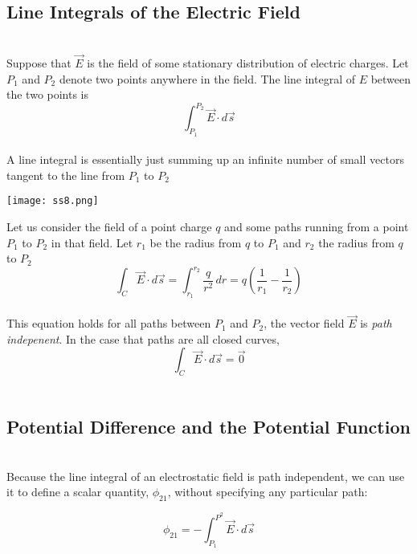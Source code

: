 \documentclass[svgnames]{article}
\begin{document}
\subsection{Line Integrals of the Electric Field} \mbox{} \\

Suppose that $\vec{E}$ is the field of some stationary distribution of electric charges. Let $P_1$ and $P_2$ denote two points anywhere in the field. The line integral of $E$ between the two points is 
\[ \int_{P_1}^{P_2} \vec{E} \cdot d\vec{s} \] \\

A line integral is essentially just summing up an infinite number of small vectors tangent to the line from $P_1$ to $P_2$ \\ 

\begin{center}
\texttt{[image: ss8.png]}
\end{center} 

Let us consider the field of a point charge $q$ and some paths running from a point $P_1$ to $P_2$ in that field. Let $r_1$ be the radius from $q$ to $P_1$ and $r_2$ the radius from $q$ to $P_2$ \\ 

\[ \int_C \vec{E} \cdot d\vec{s} = \int_{r_1}^{r_2} \frac{q}{r^2} \, dr = q\left(\frac{1}{r_1} - \frac{1}{r_2} \right) \] \\

This equation holds for all paths between $P_1$ and $P_2$, the vector field $\vec{E}$ is \textit{path indepenent}. In the case that paths are all closed curves, \\


\[ \int_C \vec{E} \cdot d\vec{s} = \vec{0} \] \\

\subsection{Potential Difference and the Potential Function} \mbox{} \\

Because the line integral of an electrostatic field is path independent, we can use it to define a scalar quantity, $\phi_{21}$, without specifying any particular path: 

\[ \phi_{21} = -\int_{P_1}^{P^2} \vec{E} \cdot d\vec{s} \] \\
\end{document}
